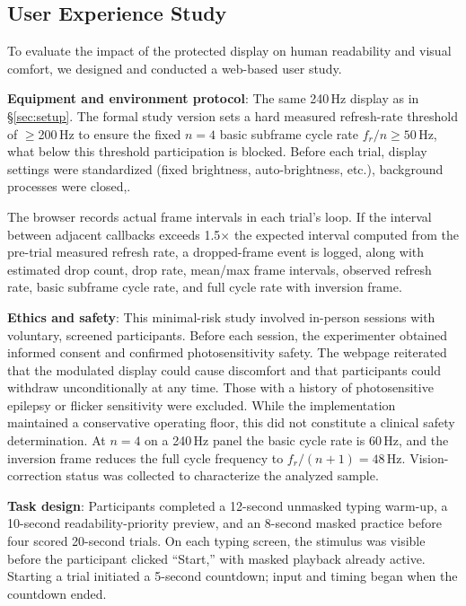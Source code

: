 \documentclass{ieeeaccess}
\begin{document}
\subsection{User Experience Study}
\label{sec:user_study}

To evaluate the impact of the protected display on human readability and visual comfort, we designed and conducted a web-based user study.

\textbf{Equipment and environment protocol}: The same 240\,Hz display as in \S\ref{sec:setup}. The formal study version sets a hard measured refresh-rate threshold of $\geq$200\,Hz to ensure the fixed $n=4$ basic subframe cycle rate $f_r/n\geq50$\,Hz, what below this threshold participation is blocked. Before each trial, display settings were standardized (fixed brightness, auto-brightness, etc.), background processes were closed,.

The browser records actual frame intervals in each trial's  loop. If the interval between adjacent callbacks exceeds 1.5$\times$ the expected interval computed from the pre-trial measured refresh rate, a dropped-frame event is logged, along with estimated drop count, drop rate, mean/max frame intervals, observed refresh rate, basic subframe cycle rate, and full cycle rate with inversion frame.

\textbf{Ethics and safety}: This minimal-risk study involved in-person sessions with voluntary, screened participants. Before each session, the experimenter obtained informed consent and confirmed photosensitivity safety. The webpage reiterated that the modulated display could cause discomfort and that participants could withdraw unconditionally at any time. Those with a history of photosensitive epilepsy or flicker sensitivity were excluded. While the implementation maintained a conservative operating floor, this did not constitute a clinical safety determination. At $n=4$ on a 240\,Hz panel the basic cycle rate is 60\,Hz, and the inversion frame reduces the full cycle frequency to $f_r/(n+1)=48$\,Hz. Vision-correction status was collected to characterize the analyzed sample.

\textbf{Task design}: Participants completed a 12-second unmasked typing warm-up, a 10-second readability-priority preview, and an 8-second masked practice before four scored 20-second trials. On each typing screen, the stimulus was visible before the participant clicked ``Start,'' with masked playback already active. Starting a trial initiated a 5-second countdown; input and timing began when the countdown ended.
\end{document}
